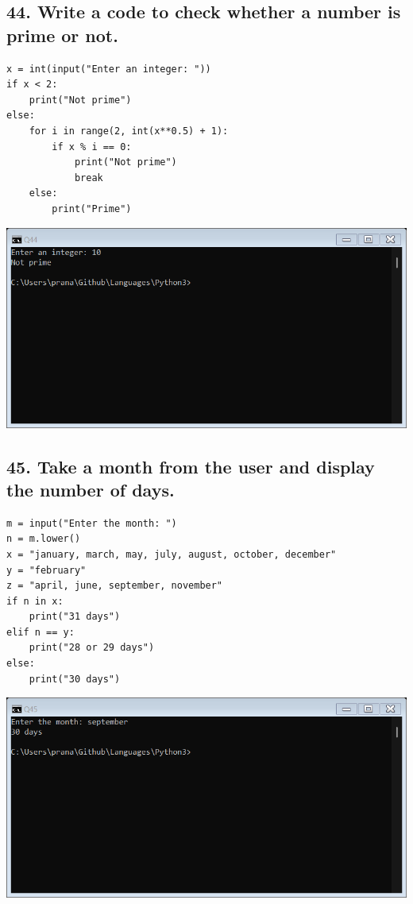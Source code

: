 \documentclass[12pt]{article}
\begin{document}
\subsection*{44. Write a code to check whether a number is prime or not.}
\begin{verbatim}
x = int(input("Enter an integer: "))
if x < 2:
    print("Not prime")
else:
    for i in range(2, int(x**0.5) + 1):
        if x % i == 0:
            print("Not prime")
            break
    else:
        print("Prime")    
\end{verbatim}
\includegraphics[width=\linewidth]{images/44.png}

\subsection*{45. Take a month from the user and display the number of days.}
\begin{verbatim}
m = input("Enter the month: ")
n = m.lower()
x = "january, march, may, july, august, october, december"
y = "february"
z = "april, june, september, november"
if n in x:
    print("31 days")
elif n == y:
    print("28 or 29 days")
else:
    print("30 days")
\end{verbatim}
\includegraphics[width=\linewidth]{images/45.png}
\end{document}

